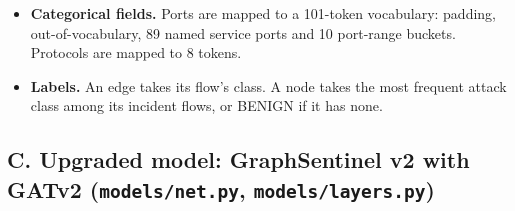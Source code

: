 \documentclass[12pt,a4paper]{report}
\begin{document}
\begin{itemize}
\begin{itemize}
        \item log number of windows seen, and burst score. These two are kept across windows in a bounded host history.
    \end{itemize}
    \item \textbf{Categorical fields.} Ports are mapped to a 101-token vocabulary: padding, out-of-vocabulary, 89 named service ports and 10 port-range buckets. Protocols are mapped to 8 tokens.
    \item \textbf{Labels.} An edge takes its flow's class. A node takes the most frequent attack class among its incident flows, or BENIGN if it has none.
\end{itemize}

\subsection*{C. Upgraded model: GraphSentinel v2 with GATv2 (\texttt{models/\allowbreak{}net.\allowbreak{}py}, \texttt{models/\allowbreak{}layers.\allowbreak{}py})}
\end{document}

